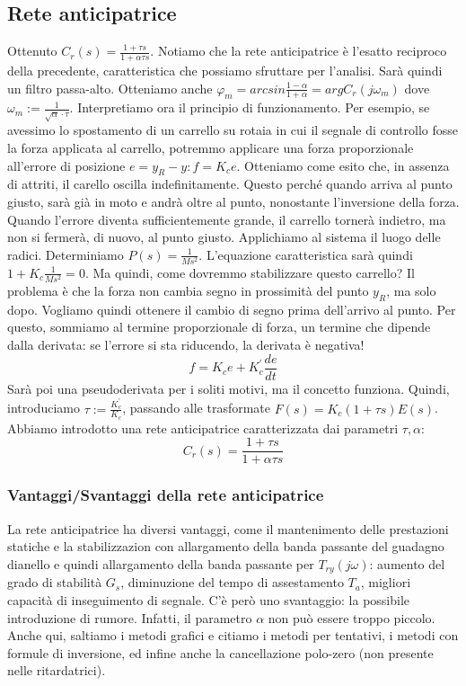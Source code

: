 \documentclass[11pt]{article}
\begin{document}
\subsection{Rete anticipatrice}
Ottenuto $C_r(s)=\frac{1+\tau s}{1+\alpha \tau s}$. Notiamo che la rete anticipatrice è l'esatto reciproco della precedente, caratteristica che possiamo sfruttare per l'analisi. Sarà quindi un filtro passa-alto. Otteniamo anche $\varphi_m = arcsin\frac{1-\alpha}{1+\alpha}=argC_r(j\omega_m)$ dove $\omega_m := \frac{1}{\sqrt{\alpha}\cdot \tau}$.
Interpretiamo ora il principio di funzionamento. Per esempio, se avessimo lo spostamento di un carrello su rotaia in cui il segnale di controllo fosse la forza applicata al carrello, potremmo applicare una forza proporzionale all'errore di posizione $e=y_R -y : f=K_ce$. Otteniamo come esito che, in assenza di attriti, il carello oscilla indefinitamente. Questo perché quando arriva al punto giusto, sarà già in moto e andrà oltre al punto, nonostante l'inversione della forza. Quando l'errore diventa sufficientemente grande, il carrello tornerà indietro, ma non si fermerà, di nuovo, al punto giusto.
Applichiamo al sistema il luogo delle radici. Determiniamo $P(s)=\frac{1}{Ms^2}$. L'equazione caratteristica sarà quindi $1+K_c \frac{1}{Ms^2}=0$. Ma quindi, come dovremmo stabilizzare questo carrello? Il problema è che la forza non cambia segno in prossimità del punto $y_R$, ma solo dopo. Vogliamo quindi ottenere il cambio di segno prima dell'arrivo al punto. Per questo, sommiamo al termine proporzionale di forza, un termine che dipende dalla derivata: se l'errore si sta riducendo, la derivata è negativa!
\begin{displaymath}
    f=K_ce+K_c^{'}\frac{de}{dt}
\end{displaymath}
Sarà poi una pseudoderivata per i soliti motivi, ma il concetto funziona. Quindi, introduciamo $\tau:=\frac{K_c^{'}}{K_c}$, passando alle trasformate $F(s)=K_c(1+\tau s)E(s)$. Abbiamo introdotto una rete anticipatrice caratterizzata dai parametri $\tau, \alpha$:
\begin{displaymath}
    C_r(s)=\frac{1+\tau s}{1+\alpha\tau s}
\end{displaymath}
\subsubsection{Vantaggi/Svantaggi della rete anticipatrice}
La rete anticipatrice ha diversi vantaggi, come il mantenimento delle prestazioni statiche e la stabilizzazion con allargamento della banda passante del guadagno dianello e quindi allargamento della banda passante per $T_{ry}(j\omega)$: aumento del grado di stabilità $G_s$, diminuzione del tempo di assestamento $T_a$, migliori capacità di inseguimento di segnale. C'è però uno svantaggio: la possibile introduzione di rumore. Infatti, il parametro $\alpha$ non può essere troppo piccolo. Anche qui, saltiamo i metodi grafici e citiamo i metodi per tentativi, i metodi con formule di inversione, ed infine anche la cancellazione polo-zero (non presente nelle ritardatrici).
\end{document}
